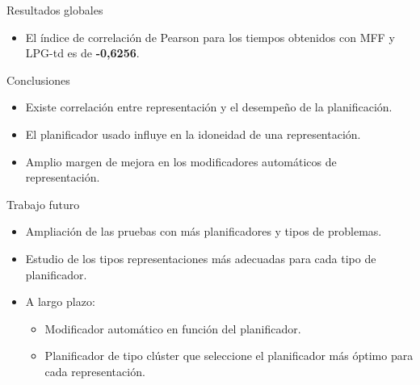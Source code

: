 \documentclass{beamer}
\begin{document}
\begin{frame}{Resultados globales}
\begin{itemize}
    \item El índice de correlación de Pearson para los tiempos obtenidos con MFF y LPG-td es de \textbf{-0,6256}.
\end{itemize}

\end{frame}


\begin{frame}{Conclusiones}
    \begin{itemize}
        \item Existe correlación entre representación y el desempeño de la planificación.
        \item El planificador usado influye en la idoneidad de una representación.
        \item Amplio margen de mejora en los modificadores automáticos de representación.
    \end{itemize}
\end{frame}


\begin{frame}{Trabajo futuro}
    \begin{itemize}
        \item Ampliación de las pruebas con más planificadores y tipos de problemas.
        \item Estudio de los tipos representaciones más adecuadas para cada tipo de planificador.
        \item A largo plazo:
        \begin{itemize}
            \item Modificador automático en función del planificador.
            \item Planificador de tipo clúster que seleccione el planificador más óptimo para cada representación.
        \end{itemize}
        
        
    \end{itemize}
\end{frame}


\end{document}
